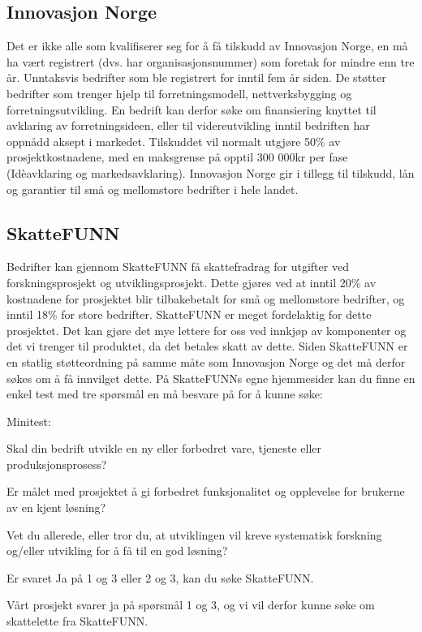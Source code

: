 \subsection{Innovasjon Norge}
Det er ikke alle som kvalifiserer seg for å få tilskudd av Innovasjon Norge, en må ha vært registrert (dvs. har organisasjonsnummer) som foretak for mindre enn tre år. Unntaksvis bedrifter som ble registrert for inntil fem år siden. 
De støtter bedrifter som trenger hjelp til forretningsmodell, nettverksbygging og forretningsutvikling. En bedrift kan derfor søke om finansiering knyttet til avklaring av forretningsideen, eller til videreutvikling inntil bedriften har oppnådd aksept i markedet. 
Tilskuddet vil normalt utgjøre 50\% av prosjektkostnadene, med en maksgrense på opptil 300 000kr per fase (Idèavklaring og markedsavklaring). \cite{innovasjonnorge}
Innovasjon Norge gir i tillegg til tilskudd, lån og garantier til små og mellomstore bedrifter i hele landet.

\subsection{SkatteFUNN}
Bedrifter kan gjennom SkatteFUNN få skattefradrag for utgifter ved forskningsprosjekt og utviklingsprosjekt. Dette gjøres ved at inntil 20\% av kostnadene for prosjektet blir tilbakebetalt for små og mellomstore bedrifter, og inntil 18\% for store bedrifter. 
SkatteFUNN er meget fordelaktig for dette prosjektet. Det kan gjøre det mye lettere for oss ved innkjøp av komponenter og det vi trenger til produktet, da det betales skatt av dette. Siden SkatteFUNN er en statlig støtteordning på samme måte som Innovasjon Norge og det må derfor søkes om å få innvilget dette. På SkatteFUNNs egne hjemmesider kan du finne en enkel test med tre spørsmål en må besvare på for å kunne søke: 

Minitest:
 
Skal din bedrift utvikle en ny eller forbedret vare, tjeneste eller produksjonsprosess? 

Er målet med prosjektet å gi forbedret funksjonalitet og opplevelse for brukerne av en kjent løsning? 

Vet du allerede, eller tror du, at utviklingen vil kreve systematisk forskning og/eller utvikling for å få til en god løsning? 

Er svaret Ja på 1 og 3 eller 2 og 3, kan du søke SkatteFUNN. \cite{skattefunn}

Vårt prosjekt svarer ja på spørsmål 1 og 3, og vi vil derfor kunne søke om skattelette fra SkatteFUNN.  

